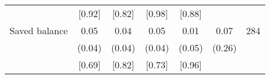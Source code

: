 \begin{table}[ht]
{\begin{threeparttable}
\begin{tabular}{l*{6}{c}}
          &   [0.92]&   [0.82]&   [0.98]&   [0.88]&         &         \\
Saved balance&     0.05&     0.04&     0.05&     0.01&     0.07&      284\\
          &   (0.04)&   (0.04)&   (0.04)&   (0.05)&   (0.26)&         \\
          &   [0.69]&   [0.82]&   [0.73]&   [0.96]&         &         \\
\bottomrule \end{tabular} \begin{tablenotes}[flushleft] \footnotesize \item  \end{tablenotes} \end{threeparttable} } \end{table}
